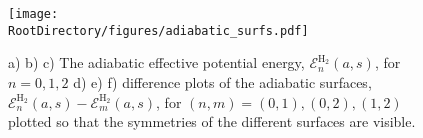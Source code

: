 \begin{figure}[ht]
\begin{center}
    \texttt{[image: \\RootDirectory/figures/adiabatic\_surfs.pdf]}
    \caption{
    a) b) c) The adiabatic effective potential energy, $\mathscr{E}^{\mathrm{H}_2}_{n}(a, s)$, for $n=0, 1, 2$ d) e) f) difference plots of the adiabatic surfaces, $\mathscr{E}^{\mathrm{H}_2}_{n}(a, s) - \mathscr{E}^{\mathrm{H}_2}_{m}(a, s)$, for $(n, m)=(0, 1), (0, 2), (1, 2)$ plotted so that the symmetries of the different surfaces are visible.
    }
\label{fig:adiabatic_surfaces}
\end{center}
\end{figure}
